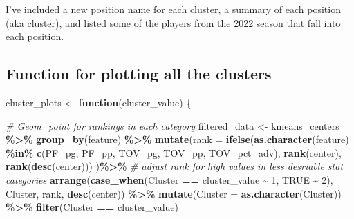 \documentclass[
]{article}
\newenvironment{Shaded}{\begin{snugshade}}{\end{snugshade}}
\newcommand{\AttributeTok}[1]{\textcolor[rgb]{0.13,0.29,0.53}{#1}}
\newcommand{\CommentTok}[1]{\textcolor[rgb]{0.56,0.35,0.01}{\textit{#1}}}
\newcommand{\ConstantTok}[1]{\textcolor[rgb]{0.56,0.35,0.01}{#1}}
\newcommand{\ControlFlowTok}[1]{\textcolor[rgb]{0.13,0.29,0.53}{\textbf{#1}}}
\newcommand{\DecValTok}[1]{\textcolor[rgb]{0.00,0.00,0.81}{#1}}
\newcommand{\FunctionTok}[1]{\textcolor[rgb]{0.13,0.29,0.53}{\textbf{#1}}}
\newcommand{\NormalTok}[1]{#1}
\newcommand{\OtherTok}[1]{\textcolor[rgb]{0.56,0.35,0.01}{#1}}
\newcommand{\SpecialCharTok}[1]{\textcolor[rgb]{0.81,0.36,0.00}{\textbf{#1}}}
\newcommand{\StringTok}[1]{\textcolor[rgb]{0.31,0.60,0.02}{#1}}
\begin{document}
I've included a new position name for each cluster, a summary of each
position (aka cluster), and listed some of the players from the 2022
season that fall into each position.

\hypertarget{function-for-plotting-all-the-clusters}{%
\subsection{Function for plotting all the
clusters}\label{function-for-plotting-all-the-clusters}}

\begin{Shaded}
\begin{Highlighting}[]
\NormalTok{cluster\_plots }\OtherTok{\textless{}{-}} \ControlFlowTok{function}\NormalTok{(cluster\_value) \{}
  
  \CommentTok{\# Geom\_point for rankings in each category}
\NormalTok{  filtered\_data }\OtherTok{\textless{}{-}}\NormalTok{ kmeans\_centers }\SpecialCharTok{\%\textgreater{}\%}
    \FunctionTok{group\_by}\NormalTok{(feature) }\SpecialCharTok{\%\textgreater{}\%}
    \FunctionTok{mutate}\NormalTok{(}\AttributeTok{rank =} \FunctionTok{ifelse}\NormalTok{(}\FunctionTok{as.character}\NormalTok{(feature) }\SpecialCharTok{\%in\%} \FunctionTok{c}\NormalTok{(}\StringTok{\textquotesingle{}PF\_pg\textquotesingle{}}\NormalTok{, }\StringTok{\textquotesingle{}PF\_pp\textquotesingle{}}\NormalTok{, }\StringTok{\textquotesingle{}TOV\_pg\textquotesingle{}}\NormalTok{, }\StringTok{\textquotesingle{}TOV\_pp\textquotesingle{}}\NormalTok{, }\StringTok{\textquotesingle{}TOV\_pct\_adv\textquotesingle{}}\NormalTok{), }
                         \FunctionTok{rank}\NormalTok{(center), }
                         \FunctionTok{rank}\NormalTok{(}\FunctionTok{desc}\NormalTok{(center)))}
\NormalTok{    )}\SpecialCharTok{\%\textgreater{}\%} \CommentTok{\# adjust rank for high values in less desriable stat categories}
    \FunctionTok{arrange}\NormalTok{(}\FunctionTok{case\_when}\NormalTok{(Cluster }\SpecialCharTok{==}\NormalTok{ cluster\_value }\SpecialCharTok{\textasciitilde{}} \DecValTok{1}\NormalTok{, }\ConstantTok{TRUE} \SpecialCharTok{\textasciitilde{}} \DecValTok{2}\NormalTok{), Cluster, rank, }\FunctionTok{desc}\NormalTok{(center)) }\SpecialCharTok{\%\textgreater{}\%}
    \FunctionTok{mutate}\NormalTok{(}\AttributeTok{Cluster =} \FunctionTok{as.character}\NormalTok{(Cluster)) }\SpecialCharTok{\%\textgreater{}\%}
    \FunctionTok{filter}\NormalTok{(Cluster }\SpecialCharTok{==}\NormalTok{ cluster\_value)}
  

\end{Highlighting}
\end{Shaded}
\end{document}
